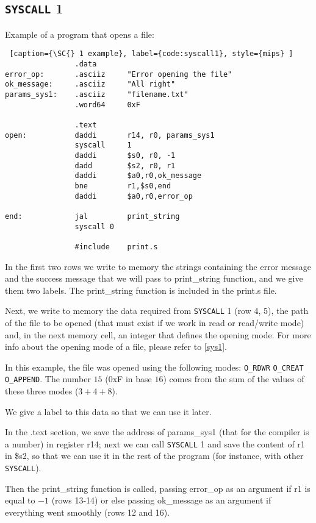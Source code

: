 \documentclass[12pt]{report}
\newcommand{\SC}{\texttt{SYSCALL}}
\begin{document}
\subsection{\SC{} 1}
Example of a program that opens a file:
\begin{lstlisting} [caption={\SC{} 1 example}, label={code:syscall1}, style={mips} ] 
                .data 
error_op:       .asciiz     "Error opening the file"    
ok_message:     .asciiz     "All right"
params_sys1:    .asciiz     "filename.txt"
                .word64     0xF                    

                .text
open:           daddi       r14, r0, params_sys1    
                syscall     1    
                daddi       $s0, r0, -1
                dadd        $s2, r0, r1        
                daddi       $a0,r0,ok_message            
                bne         r1,$s0,end            
                daddi       $a0,r0,error_op

end:            jal         print_string
                syscall 0
        
                #include    print.s      
\end{lstlisting}
In the first two rows we write to memory the strings containing the error
message and the success message that we will pass to print\_string function, and
we give them two labels. The print\_string function is included in the print.s
file.

Next, we write to memory the data required from \SC{} 1 (row 4, 5), the path of
the file to be opened (that must exist if we work in read or read/write mode)
and, in the next memory cell, an integer that defines the opening mode. For more
info about the opening mode of a file, please refer to \ref{sys1}.

In this example, the file was opened using the following modes: 
\texttt{O\_RDWR} \textbar{} \texttt{O\_CREAT} \textbar{} \texttt{O\_APPEND}. The
number $15$ (0xF in base $16$) comes from the sum of the values of these three
modes ($3 + 4 + 8$).

We give a label to this data so that we can use it later.

In the .text section, we save the address of params\_sys1 (that for the compiler
is a number) in register r14; next we can call \SC{} 1 and save the content of
r1 in \$s2, so that we can use it in the rest of the program (for instance, with
other \SC{}).

Then the print\_string function is called, passing error\_op as an argument if
r1 is equal to $-1$ (rows 13-14) or else passing ok\_message as an argument if
everything went smoothly (rows 12 and 16).
\end{document}
